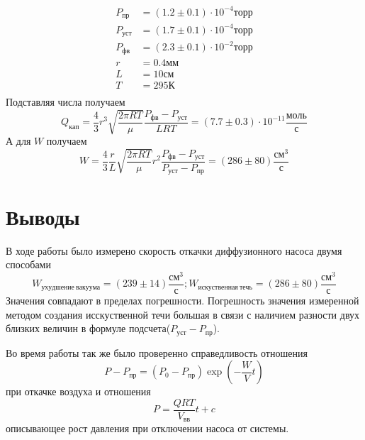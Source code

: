 \documentclass{article}
\begin{document}
    \begin{align*}
        P_{пр}&=(1.2 \pm 0.1)\cdot10^{-4}торр\\
        P_{уст}&=(1.7 \pm 0.1)\cdot10^{-4}торр\\
        P_{фв}&=(2.3 \pm 0.1)\cdot 10^{-2}торр\\
        r&=0.4мм\\
        L&=10см\\
        T&=295К\\
    \end{align*}
    Подставляя числа получаем
    \begin{equation}
        Q_{кап}=\frac{4}{3}r^3\sqrt{\frac{2\pi RT}{\mu}}\frac{P_{фв} - P_{уст}}{LRT}=(7.7 \pm 0.3) \cdot 10^{-11} \frac{моль}{с}
    \end{equation}
    А для $W$ получаем
    \begin{equation}
    W=\frac{4}{3}\frac{r}{L}\sqrt{\frac{2\pi RT}{\mu}}r^2\frac{P_{фв} - P_{уст}}{P_{уст} - P_{пр}}=(286 \pm 80)\frac{см^3}{с}
    \end{equation}


    \section{Выводы}
    В ходе работы было измерено скорость откачки диффузионного насоса двумя способами
    \begin{equation}
        W_{ухудшение\  вакуума} = (239 \pm 14)\frac{см^3}{с}; W_{искуственная\  течь} = (286 \pm 80)\frac{см^3}{с}
    \end{equation}
    Значения совпадают в пределах погрешности. Погрешность значения измеренной методом создания исскуственной течи большая в связи с наличием разности двух близких величин в формуле подсчета($P_{уст} - P_{пр}$).

    Во время работы так же было проверенно справедливость отношения
    \begin{equation*}
        P-P_{пр}=(P_0 - P_{пр})\exp\left(-\frac{W}{V}t\right)
    \end{equation*}
    при откачке воздуха и отношения
    \begin{equation*}
        P = \frac{QRT}{V_{вв}}t + c
    \end{equation*}
    описывающее рост давления при отключении насоса от системы.

    \vspace{1cm}
\end{document}
